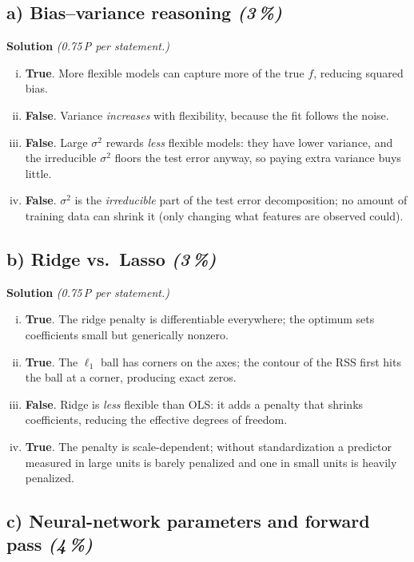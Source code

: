 \documentclass[11pt,a4paper]{article}
\newcommand{\subpoints}[1]{\textit{(#1\,\%)}}
\newcommand{\sol}{\noindent\textbf{Solution}}
\begin{document}
\subsection*{a) Bias--variance reasoning \subpoints{3}}
\sol{} \emph{(0.75\,P per statement.)}
\begin{enumerate}[(i)]
  \item \textbf{True}. More flexible models can capture more of the true $f$, reducing squared bias.
  \item \textbf{False}. Variance \emph{increases} with flexibility, because the fit follows the noise.
  \item \textbf{False}. Large $\sigma^2$ rewards \emph{less} flexible models: they have lower variance,
        and the irreducible $\sigma^2$ floors the test error anyway, so paying extra variance buys little.
  \item \textbf{False}. $\sigma^2$ is the \emph{irreducible} part of the test error decomposition; no
        amount of training data can shrink it (only changing what features are observed could).
\end{enumerate}

\subsection*{b) Ridge vs.\ Lasso \subpoints{3}}
\sol{} \emph{(0.75\,P per statement.)}
\begin{enumerate}[(i)]
  \item \textbf{True}. The ridge penalty is differentiable everywhere; the optimum sets coefficients
        small but generically nonzero.
  \item \textbf{True}. The $\ell_1$ ball has corners on the axes; the contour of the RSS first hits
        the ball at a corner, producing exact zeros.
  \item \textbf{False}. Ridge is \emph{less} flexible than OLS: it adds a penalty that shrinks
        coefficients, reducing the effective degrees of freedom.
  \item \textbf{True}. The penalty is scale-dependent; without standardization a predictor measured
        in large units is barely penalized and one in small units is heavily penalized.
\end{enumerate}

\subsection*{c) Neural-network parameters and forward pass \subpoints{4}}
\end{document}

